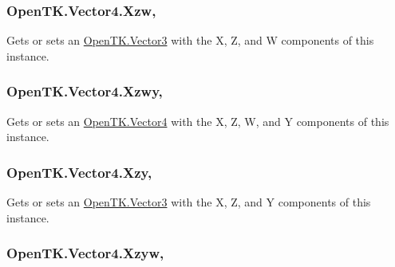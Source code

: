 \hypertarget{struct_open_t_k_1_1_vector4_a6bc1c65cf068055bcb0be9ee07fd9699}{
\subsubsection[{Xzw}]{ Open\-T\-K.\-Vector4.\-Xzw\hspace{0.3cm}{\ttfamily [get]}, {\ttfamily [set]}}}\label{struct_open_t_k_1_1_vector4_a6bc1c65cf068055bcb0be9ee07fd9699}


Gets or sets an \hyperlink{struct_open_t_k_1_1_vector3}{Open\-T\-K.\-Vector3} with the X, Z, and W components of this instance. 

\hypertarget{struct_open_t_k_1_1_vector4_a9562c726042c83a05978d9d4dceb6a71}{
\subsubsection[{Xzwy}]{ Open\-T\-K.\-Vector4.\-Xzwy\hspace{0.3cm}{\ttfamily [get]}, {\ttfamily [set]}}}\label{struct_open_t_k_1_1_vector4_a9562c726042c83a05978d9d4dceb6a71}


Gets or sets an \hyperlink{struct_open_t_k_1_1_vector4}{Open\-T\-K.\-Vector4} with the X, Z, W, and Y components of this instance. 

\hypertarget{struct_open_t_k_1_1_vector4_a37dfb24fdb8b51e9bb06efe376c5103c}{
\subsubsection[{Xzy}]{ Open\-T\-K.\-Vector4.\-Xzy\hspace{0.3cm}{\ttfamily [get]}, {\ttfamily [set]}}}\label{struct_open_t_k_1_1_vector4_a37dfb24fdb8b51e9bb06efe376c5103c}


Gets or sets an \hyperlink{struct_open_t_k_1_1_vector3}{Open\-T\-K.\-Vector3} with the X, Z, and Y components of this instance. 

\hypertarget{struct_open_t_k_1_1_vector4_a9d766347910a9c70e72320a6b89a43c8}{
\subsubsection[{Xzyw}]{ Open\-T\-K.\-Vector4.\-Xzyw\hspace{0.3cm}{\ttfamily [get]}, {\ttfamily [set]}}}\label{struct_open_t_k_1_1_vector4_a9d766347910a9c70e72320a6b89a43c8}



